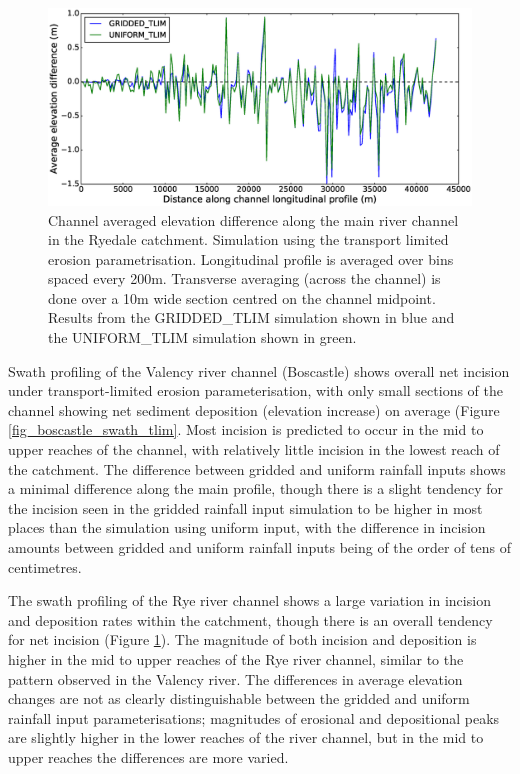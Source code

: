 \begin{figure}[htb]
\includegraphics[width=14cm]{chp06_figures_scripts/fig_swath_profile_ryedale_erode_tlim.eps}
\caption{Channel averaged elevation difference along the main river channel in the Ryedale catchment. Simulation using the transport limited erosion parametrisation. Longitudinal profile is averaged over bins spaced every 200m. Transverse averaging (across the channel) is done over a 10m wide section centred on the channel midpoint. Results from the GRIDDED\_TLIM simulation shown in blue and the UNIFORM\_TLIM simulation shown in green.}
\label{fig_ryedale_swath_tlim}
\end{figure}

Swath profiling of the Valency river channel (Boscastle) shows overall net incision under transport-limited erosion parameterisation, with only small sections of the channel showing net sediment deposition (elevation increase) on average (Figure \ref{fig_boscastle_swath_tlim}. Most incision is predicted to occur in the mid to upper reaches of the channel, with relatively little incision in the lowest reach of the catchment. The difference between gridded and uniform rainfall inputs shows a minimal difference along the main profile, though there is a slight tendency for the incision seen in the gridded rainfall input simulation to be higher in most places than the simulation using uniform input, with the difference in incision amounts between gridded and uniform rainfall inputs being of the order of tens of centimetres.

The swath profiling of the Rye river channel shows a large variation in incision and deposition rates within the catchment, though there is an overall tendency for net incision (Figure \ref{fig_ryedale_swath_tlim}). The magnitude of both incision and deposition is higher in the mid to upper reaches of the Rye river channel, similar to the pattern observed in the Valency river. The differences in average elevation changes are not as clearly distinguishable between the gridded and uniform rainfall input parameterisations; magnitudes of erosional and depositional peaks are slightly higher in the lower reaches of the river channel, but in the mid to upper reaches the differences are more varied. 
 
